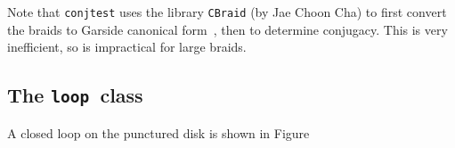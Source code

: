 \documentclass[12pt]{article}
\newcommand{\loopc}{\texttt{loop}}%
\begin{document}
Note that \lstinline{conjtest} uses the library \texttt{CBraid} (by
Jae Choon Cha) to first convert the braids to Garside canonical
form~\citep{Birman2005}, then to determine conjugacy.  This is very
inefficient, so is impractical for large braids.


\subsection{The \loopc\ class}
\label{sec:loop}

A closed loop on the punctured disk is shown in Figure~




% 
\end{document}
